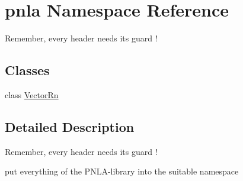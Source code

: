 \hypertarget{namespacepnla}{}\section{pnla Namespace Reference}
\label{namespacepnla}


Remember, every header needs it\textquotesingle{}s guard !  


\subsection*{Classes}
\begin{DoxyCompactItemize}
\item 
class \mbox{\hyperlink{classpnla_1_1VectorRn}{Vector\+Rn}}
\end{DoxyCompactItemize}


\subsection{Detailed Description}
Remember, every header needs it\textquotesingle{}s guard ! 

put everything of the P\+N\+L\+A-\/library into the suitable namespace 